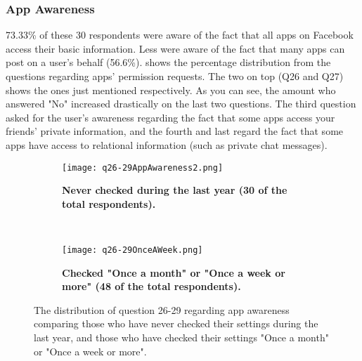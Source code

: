 \subsubsection{App Awareness}
73.33\% of these 30 respondents were aware of the fact that all apps on Facebook access their basic information. Less were aware of the fact that many apps can post on a user's behalf (56.6\%).  shows the percentage distribution from the questions regarding apps' permission requests. The two on top (Q26 and Q27) shows the ones just mentioned respectively. As you can see, the amount who answered "No" increased drastically on the last two questions. The third question asked for the user's awareness regarding the fact that some apps access your friends' private information, and the fourth and last regard the fact that some apps have access to relational information (such as private chat messages). 


\begin{figure}
        \centering
        \begin{subfigure}[t]{0.5\textwidth}
            \texttt{[image: q26-29AppAwareness2.png]}
			\caption[The distribution of question 26-29, showing app 					awareness among the 30 respondents that have never checked 					their Facebook settings during the last year]
			{\textbf{Never checked during the last year (30 of the total				respondents).}} 
			\label{fig:appawarenessneverchecked}
		\end{subfigure}%
		 ~ %
        \begin{subfigure}[t]{0.46\textwidth}
            \texttt{[image: q26-29OnceAWeek.png]}
			\caption[The distribution of question 26-29 showing app 					awareness among the 48 respondents that checks their Facebook 			settings "Once a month" or "Once a week or more"]
			{\textbf{Checked "Once a month" or "Once a week or more" (48 				of the total respondents).}} 
			\label{fig:appawarenessonceaweek}
        \end{subfigure}
        \caption{The distribution of question 26-29 regarding app awareness comparing those who have never checked their settings during the last year, and those who have checked their settings "Once a month" or "Once a week or more".}
\label{fig:appawarenessinregardtohowoftentheycheck}
\end{figure}



